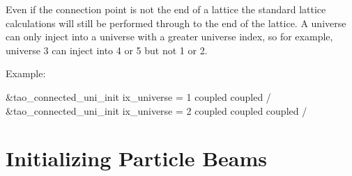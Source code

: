 {{{{{{{{{{{{{{{Even if the connection point is not the end of a lattice the standard lattice
calculations will still be performed through to the end of the
lattice.  A universe can only inject into a universe with a greater
universe index, so for example, universe 3 can inject into 4 or 5 but
not 1 or 2.

Example:
\begin{example}
  &tao_connected_uni_init
    ix_universe = 1
    coupled%
    coupled%
  /
  &tao_connected_uni_init
    ix_universe = 2
    coupled%
    coupled%
    coupled%
  /
\end{example}

\section{Initializing Particle Beams}
\label{s:beam.init}

}}}}}}}}}}}}}}}

